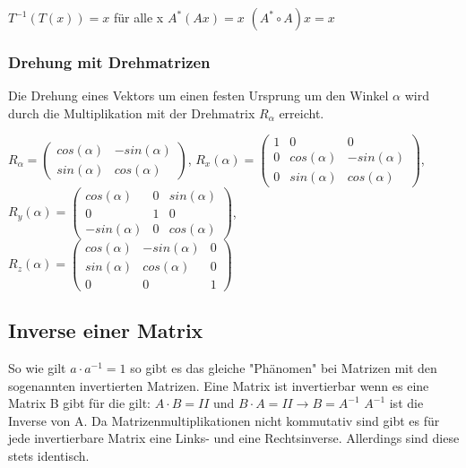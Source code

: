 \documentclass[11pt,a4paper,onecolumn]{scrartcl}
\begin{document}
\begin{flushleft}
$ T^{-1}(T(x)) = x $ für alle x\linebreak
$ A^{*} (Ax) = x $\linebreak
$ (A^{*} \circ A)x = x $\linebreak

\subsubsection{Drehung mit Drehmatrizen}
Die Drehung eines Vektors um einen festen Ursprung um den Winkel $\alpha$ wird durch die Multiplikation mit der Drehmatrix $R_{\alpha}$ erreicht.\linebreak

$
R_{\alpha} = \begin{pmatrix}
    cos(\alpha) & -sin(\alpha) \\
    sin(\alpha) & cos(\alpha)
\end{pmatrix}
$,
$
R_{x}(\alpha) = \begin{pmatrix}
    1 & 0 & 0 \\
    0 & cos(\alpha) & -sin(\alpha) \\
    0 & sin(\alpha) & cos(\alpha)
\end{pmatrix}
$,
$
R_{y}(\alpha) = \begin{pmatrix}
    cos(\alpha) & 0 & sin(\alpha) \\
    0 & 1 & 0 \\
    -sin(\alpha) & 0 & cos(\alpha)
\end{pmatrix}
$,
$
R_{z}(\alpha) = \begin{pmatrix}
    cos(\alpha) & -sin(\alpha) & 0 \\
    sin(\alpha) & cos(\alpha) & 0 \\
    0 & 0 & 1
\end{pmatrix}
$
\subsection{Inverse einer Matrix}
So wie gilt $a \cdot a^{-1} = 1$ so gibt es das gleiche "Phänomen" bei Matrizen mit den sogenannten invertierten Matrizen. Eine Matrix ist invertierbar wenn es eine Matrix B gibt für die gilt:\linebreak \linebreak
$ A \cdot B = II $ und $ B \cdot A = II  \longrightarrow B = A^{-1} $ \linebreak \linebreak
$A^{-1} $ ist die Inverse von A. Da Matrizenmultiplikationen nicht kommutativ sind gibt es für jede invertierbare Matrix eine Links- und eine Rechtsinverse. Allerdings sind diese stets identisch.\linebreak


\end{flushleft}
\end{document}
